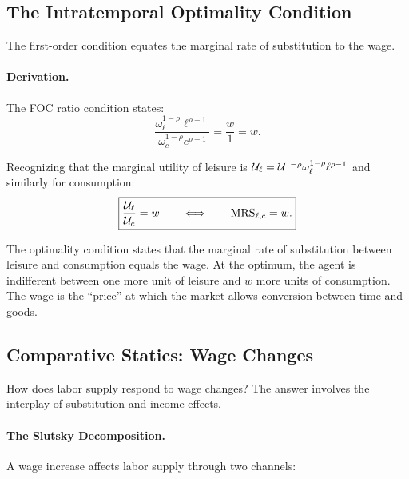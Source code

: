 \subsection{The Intratemporal Optimality Condition}
\label{subsec:labor-foc}

The first-order condition equates the marginal rate of substitution to the wage.

\paragraph{Derivation.}
The FOC ratio condition states:
\begin{equation}
\frac{\omega_\ell^{1-\rho} \ell^{\rho-1}}{\omega_c^{1-\rho} c^{\rho-1}} = \frac{w}{1} = w.
\label{eq:mrs-wage}
\end{equation}

Recognizing that the marginal utility of leisure is $\mathcal{U}_\ell = \mathcal{U}^{1-\rho} \omega_\ell^{1-\rho} \ell^{\rho-1}$ and similarly for consumption:
\begin{equation}
\boxed{\frac{\mathcal{U}_\ell}{\mathcal{U}_c} = w \qquad \Longleftrightarrow \qquad \text{MRS}_{\ell,c} = w.}
\label{eq:mrs-condition}
\end{equation}

\begin{calloutnote}[Interpretation]
The optimality condition states that the marginal rate of substitution between leisure and consumption equals the wage. At the optimum, the agent is indifferent between one more unit of leisure and $w$ more units of consumption. The wage is the ``price'' at which the market allows conversion between time and goods.
\end{calloutnote}

\subsection{Comparative Statics: Wage Changes}
\label{subsec:labor-comparative}

How does labor supply respond to wage changes? The answer involves the interplay of substitution and income effects.

\paragraph{The Slutsky Decomposition.}
A wage increase affects labor supply through two channels:

